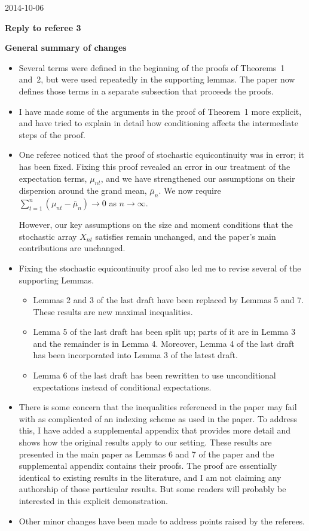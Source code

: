 \documentclass[12pt]{article}
\begin{document}
\hfill 2014-10-06

\noindent \textbf{Reply to referee 3}

\noindent \textbf{General summary of changes}

\begin{itemize}
\item Several terms were defined in the beginning of the proofs of
  Theorems~1 and~2, but were used repeatedly in the supporting
  lemmas. The paper now defines those terms in a separate subsection
  that proceeds the proofs.

\item I have made some of the arguments in the proof of Theorem~1 more
  explicit, and have tried to explain in detail how conditioning
  affects the intermediate steps of the proof.

\item One referee noticed that the proof of stochastic equicontinuity
  was in error; it has been fixed. Fixing this proof revealed an error
  in our treatment of the expectation terms, $\mu_{nt}$, and we have
  strengthened our assumptions on their dispersion around the grand
  mean, $\bar \mu_n$. We now require
  $\sum_{t=1}^n (\mu_{nt} - \bar \mu_n) \to 0$
  as $n \to \infty$.

  However, our key assumptions on the size and moment conditions that
  the stochastic array $X_{nt}$ satisfies remain unchanged, and the
  paper's main contributions are unchanged.

\item Fixing the stochastic equicontinuity proof also led me to revise
  several of the supporting Lemmas.
  \begin{itemize}
  \item Lemmas 2 and 3 of the last draft have been replaced by Lemmas
    5 and 7. These results are new maximal inequalities.
  \item Lemma 5 of the last draft has been split up; parts of it are
    in Lemma 3 and the remainder is in Lemma 4. Moreover, Lemma 4 of
    the last draft has been incorporated into Lemma 3 of the latest draft.
  \item Lemma 6 of the last draft has been rewritten to use
    unconditional expectations instead of conditional expectations.
  \end{itemize}

\item There is some concern that the inequalities referenced in the
  paper may fail with as complicated of an indexing scheme as used in
  the paper. To address this, I have added a supplemental appendix
  that provides more detail and shows how the original results apply
  to our setting. These results are presented in the main paper as
  Lemmas 6 and 7 of the paper and the supplemental appendix contains
  their proofs. The proof are essentially identical to existing
  results in the literature, and I am not claiming any authorship of
  those particular results. But some readers will probably be
  interested in this explicit demonstration.

\item Other minor changes have been made to address points raised by
  the referees.
\end{itemize}
\end{document}

